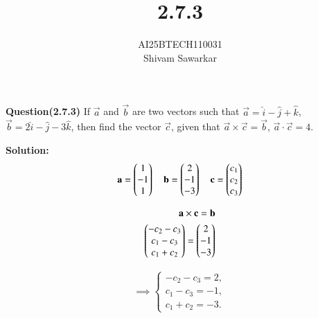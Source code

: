\documentclass[journal]{IEEEtran}
\begin{document}

\vspace{3cm}

\title{2.7.3}
\author{AI25BTECH110031 \\ Shivam Sawarkar}
 \maketitle
{\let\newpage\relax\maketitle}

\renewcommand{\thefigure}{\theenumi}
\renewcommand{\thetable}{\theenumi}
\setlength{\intextsep}{10pt} %


\renewcommand{\thetable}{\theenumi}

\textbf{Question(2.7.3)}
If $\vec{a}$ and $\vec{b}$ are two vectors such that $\vec{a} = \hat{i} - \hat{j} + \hat{k}$, $\vec{b} = 2\hat{i} - \hat{j} - 3\hat{k}$, then find the vector $\vec{c}$, given that $\vec{a} \times \vec{c} = \vec{b}$, $\vec{a} \cdot \vec{c} = 4$.


\textbf{Solution:}  
\begin{align}
\mathbf{a} = \begin{pmatrix}1 \\ -1 \\ 1\end{pmatrix} \quad 
\mathbf{b} = \begin{pmatrix}2 \\ -1 \\ -3\end{pmatrix} \quad 
\mathbf{c} = \begin{pmatrix}c_1 \\ c_2 \\ c_3\end{pmatrix}
\end{align}

\begin{align}
\mathbf{a}\times\mathbf{c} = \mathbf{b} \\ 
\begin{pmatrix}-c_2 -c_3 \\ c_1-c_3 \\ c_1 + c_2\end{pmatrix}=\begin{pmatrix}2 \\ -1 \\ -3\end{pmatrix}
\end{align}


\begin{align}
\implies 
\begin{cases}
-c_2-c_3 = 2,\\
c_1-c_3 = -1,\\
c_1+c_2 = -3.
\end{cases}
\end{align}
\end{document}
